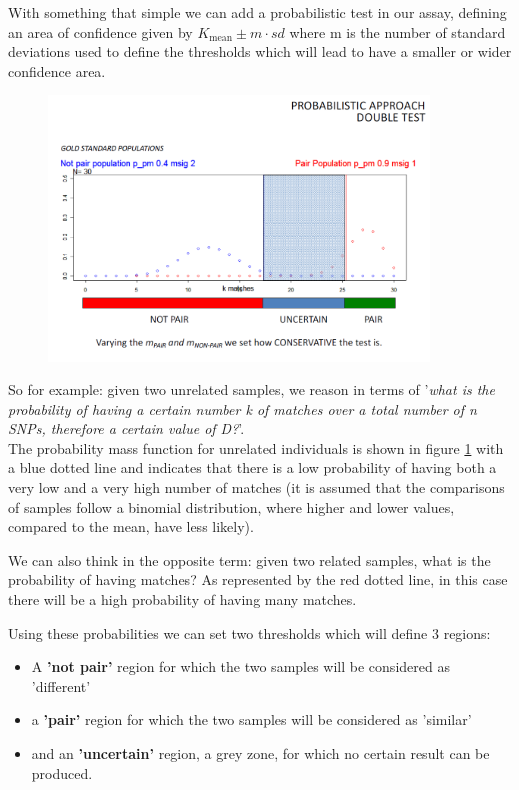 With something that simple we can add a probabilistic test in our assay,
defining an area of confidence given by $K_{\text{mean}} \pm m \cdot sd$ where m
is the number of standard deviations used to define the thresholds which will
lead to have a smaller or wider confidence area. 

\begin{figure}[H]
	\centering
	\includegraphics[width=0.9\textwidth]{Prob_test.PNG}
	\caption{\label{fig:prob_test}}
\end{figure}

\bigskip
So for example: given two unrelated samples, we reason in terms of '\textit{what
is the probability of having a certain number k of matches over a total number
of n SNPs, therefore a certain value of D?}'. \\

The probability mass function for unrelated individuals is shown in figure
\ref{fig:prob_test} with a blue dotted line and indicates that there is a low
probability of having both a very low and a very high number of matches (it is
assumed that the comparisons of samples follow a binomial distribution, where
higher and lower values, compared to the mean, have less likely). 

\noindent We can also think in the opposite term: given two related samples, what is the
probability of having  matches? As represented by the red dotted line, in this
case there will be a high probability of having many matches. 

Using these probabilities we can set two thresholds which will define 3 regions:
\begin{itemize}
	\item A \textbf{'not pair'} region for which the two samples will be
	considered as 'different'
 	\item a \textbf{'pair'} region for which the two samples will be considered
 	as 'similar'
	\item and an \textbf{'uncertain'} region, a grey zone, for which no certain
	result can be produced. 
\end{itemize}

